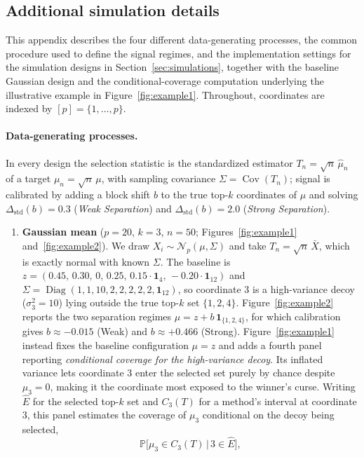 \documentclass[12pt]{article}
\newcommand{\Pp}{{\mathbb{P}}}
\newcommand{\Ehat}{\widehat{E}}
\begin{document}
\begin{appendices}
\section{Additional simulation details}
\label{app:sim-details}
This appendix describes the four different data-generating processes, the common procedure used to define the signal regimes, and the implementation settings for the simulation designs in Section~\ref{sec:simulations}, together with the baseline Gaussian design and the conditional-coverage computation underlying the illustrative example in Figure~\ref{fig:example1}. Throughout, coordinates are indexed by $[p]=\{1,\dots,p\}$.
\paragraph{Data-generating processes.}
In every design the selection statistic is the standardized estimator
$T_n=\sqrt n\,\widehat\mu_n$ of a target $\mu_n=\sqrt n\,\mu$, with
sampling covariance $\Sigma=\operatorname{Cov}(T_n)$; signal is calibrated by
adding a block shift $b$ to the true top-$k$ coordinates of $\mu$ and
solving $\Delta_{\mathrm{std}}(b)=0.3$ (\emph{Weak Separation}) and
$\Delta_{\mathrm{std}}(b)=2.0$ (\emph{Strong Separation}).
\begin{enumerate}[leftmargin=*]
\item \textbf{Gaussian mean} ($p=20$, $k=3$, $n=50$; Figures~\ref{fig:example1} and~\ref{fig:example2}).
We draw $X_i\sim\mathcal N_p(\mu,\Sigma)$ and take $T_n=\sqrt n\,\bar X$, which is
exactly normal with known $\Sigma$. The baseline is
$z=(0.45,\,0.30,\,0,\,0.25,\,0.15\cdot\mathbf 1_4,\,-0.20\cdot\mathbf 1_{12})$ and
$\Sigma=\operatorname{Diag}(1,1,10,2,2,2,2,2,\mathbf 1_{12})$, so coordinate $3$ is
a high-variance decoy ($\sigma_3^2=10$) lying outside the true top-$k$ set $\{1,2,4\}$.
Figure~\ref{fig:example2} reports the two separation regimes $\mu=z+b\,\mathbf 1_{\{1,2,4\}}$,
for which calibration gives $b\approx-0.015$ (Weak) and $b\approx+0.466$ (Strong).
Figure~\ref{fig:example1} instead fixes the baseline configuration $\mu=z$ and adds a fourth panel reporting
\emph{conditional coverage for the high-variance decoy}. Its inflated variance lets
coordinate $3$ enter the selected set purely by chance despite $\mu_3=0$, making it the
coordinate most exposed to the winner's curse. Writing $\Ehat$ for the selected top-$k$
set and $C_3(T)$ for a method's interval at coordinate $3$, this panel estimates the
coverage of $\mu_3$ conditional on the decoy being selected,
\[
  \Pp\bigl[\mu_3\in C_3(T)\,\big|\,3\in\Ehat\bigr],
\]
\end{enumerate}
\end{appendices}
\end{document}
